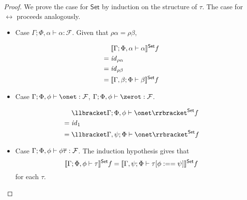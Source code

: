 \documentclass[acmsmall,review,anonymous]{acmart}
\theoremstyle{definition}
\newcommand{\F}{\mathcal{F}}
\newcommand{\set}{\mathsf{Set}}
\renewcommand{\id}{\mathit{id}}
\begin{document}
\begin{proof}
We prove the case for $\set$ by induction on the structure of $\tau$.
The case for $\rel$ proceeds analogously.

\begin{itemize}

  \item Case $\Gamma; \Phi, \alpha \vdash \alpha : \F$. Given that $\rho \alpha = \rho \beta$, 
      
    \begin{align*}
         & \setsem{\Gamma; \Phi, \alpha \vdash \alpha } f \\
      = \; & \id_{\rho \alpha} \\
      = \; & \id_{\rho \beta}  \\
      = \; & \setsem{\Gamma, \beta; \Phi \vdash \beta } f
    \end{align*}

  \item Case $\Gamma; \Phi, \phi \vdash \onet :\F$,  $\Gamma; \Phi, \phi \vdash \zerot :\F$.

    \begin{align*}
         & \setsem{\Gamma; \Phi, \phi \vdash \onet } f \\
      = \; & \id_1 \\
      = \; & \setsem{\Gamma, \psi; \Phi \vdash \onet } f
    \end{align*}

  \item Case $\Gamma; \Phi, \phi \vdash \phi \ol\tau : \F$. The induction hypothesis gives that 
    $$\setsem{\Gamma; \Phi, \phi \vdash \tau} f = 
      \setsem{\Gamma, \psi; \Phi \vdash \tau[\phi :== \psi]} f$$
    for each $\tau$.


\end{itemize}
\end{proof}
\end{document}
